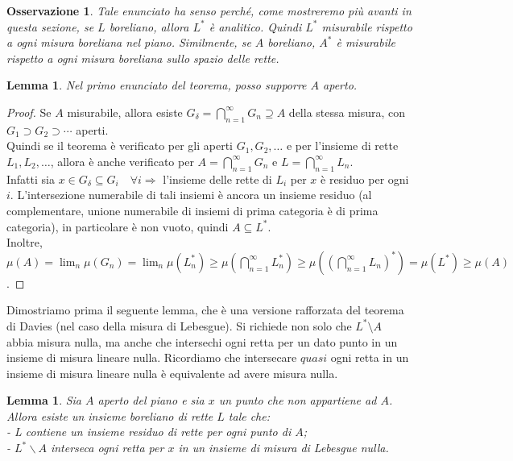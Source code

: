 \documentclass[a4paper, twoside,openright]{article}
\newcommand{\Ra}{\Rightarrow}
\newcommand{\fa}{\forall}
\newcommand{\<}{\langle}
\renewcommand{\>}{\rangle}
\newtheorem{lemma}[teo]{Lemma}
\newtheorem{oss}[teo]{Osservazione}
\begin{document}
\begin{oss}
	Tale enunciato ha senso perché, come mostreremo più avanti in questa sezione, se $L$ boreliano, allora $L^{*}$ è analitico. Quindi $L^{*}$ misurabile rispetto a ogni misura boreliana nel piano. Similmente, se $A$ boreliano, $A^{*}$ è misurabile rispetto a ogni misura boreliana sullo spazio delle rette.
\end{oss}	
	
\begin{lemma}
	Nel primo enunciato del teorema, posso supporre $A$ aperto.
\end{lemma}

\begin{proof}
	Se $A$ misurabile, allora esiste $G_{\delta} = \bigcap_{n=1}^{\infty} G_{n} \supseteq A$ della stessa misura, con $G_{1} \supset G_{2} \supset \cdots$ aperti.\\
	Quindi se il teorema è verificato per gli aperti $G_{1}, G_{2}, \ldots$ e per l'insieme di rette $L_{1}, L_{2}, \ldots$, allora è anche verificato per  $A=\bigcap_{n=1}^{\infty} G_{n}$ e $L=\bigcap_{n=1}^{\infty} L_{n}$.\\
	Infatti sia $x \in G_{\delta} \subseteq G_i \quad \fa i \Ra$ l'insieme delle rette di $L_i$ per $x$ è residuo per ogni $i$. L'intersezione numerabile di tali insiemi è ancora un insieme residuo (al complementare, unione numerabile di insiemi di prima categoria è di prima categoria), in particolare è non vuoto, quindi $A \subseteq L^*$.\\
	Inoltre, $\mu(A) = \lim_n \mu(G_n) = \lim_n \mu(L_n^*) \geq \mu\left(\bigcap_{n=1}^\infty L_n^*\right) \geq \mu\left(\left(\bigcap_{n=1}^\infty L_n\right)^*\right) = \mu(L^*) \geq \mu(A)$.	
\end{proof}

Dimostriamo prima il seguente lemma, che è una versione rafforzata del teorema di Davies (nel caso della misura di Lebesgue). Si richiede non solo che $L^* \setminus A$ abbia misura nulla, ma anche che intersechi ogni retta per un dato punto in un insieme di misura lineare nulla. Ricordiamo che intersecare $quasi$ ogni retta in un insieme di misura lineare nulla è equivalente ad avere misura nulla.

\begin{lemma}
Sia $A$ aperto del piano e sia $x$ un punto che non appartiene ad $A$. Allora esiste un insieme boreliano di rette $L$ tale che:\\
- L contiene un insieme residuo di rette per ogni punto di $A$;\\
- $L^{*} \backslash A$ interseca ogni retta per $x$ in un insieme di misura di Lebesgue nulla.
\end{lemma}
\end{document}
